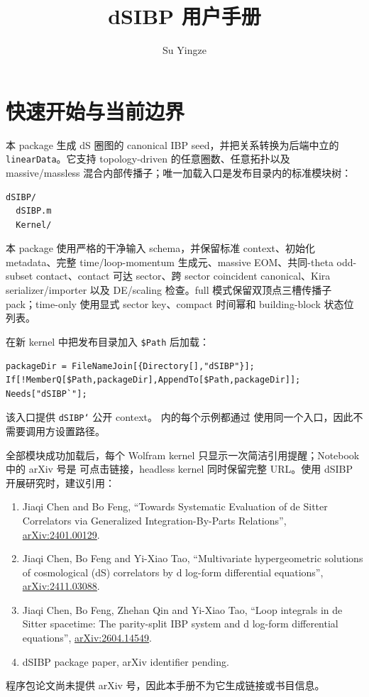 ﻿\documentclass[a4paper,11pt]{article}
\title{dSIBP 用户手册}
\author[a]{Su Yingze}
\affiliation[a]{Institute not specified}
\begin{document}
\sloppy
\setcounter{tocdepth}{1}
\maketitle
\newpage

\section{快速开始与当前边界}

本 package 生成 dS 圈图的 canonical IBP seed，并把关系转换为后端中立的 \texttt{linearData}。它支持 topology-driven 的任意圈数、任意拓扑以及 massive/massless 混合内部传播子；唯一加载入口是发布目录内的标准模块树：
\begin{verbatim}
dSIBP/
  dSIBP.m
  Kernel/
\end{verbatim}
本 package 使用严格的干净输入 schema，并保留标准 context、初始化 metadata、完整 time/loop-momentum 生成元、massive EOM、共同-theta odd-subset contact、contact 可达 sector、跨 sector coincident canonical、Kira serializer/importer 以及 DE/scaling 检查。full 模式保留双顶点三槽传播子 pack；time-only 使用显式 sector key、compact 时间幂和 building-block 状态位列表。

在新 kernel 中把发布目录加入 \texttt{\$Path} 后加载：
\begin{verbatim}
packageDir = FileNameJoin[{Directory[],"dSIBP"}];
If[!MemberQ[$Path,packageDir],AppendTo[$Path,packageDir]];
Needs["dSIBP`"];
\end{verbatim}
该入口提供 \texttt{dSIBP`} 公开 context。 内的每个示例都通过
 使用同一个入口，因此不需要调用方设置路径。

全部模块成功加载后，每个 Wolfram kernel 只显示一次简洁引用提醒；Notebook 中的 arXiv 号是
可点击链接，headless kernel 同时保留完整 URL。使用 dSIBP 开展研究时，建议引用：
\begin{enumerate}
  \item Jiaqi Chen and Bo Feng, ``Towards Systematic Evaluation of de Sitter Correlators via Generalized Integration-By-Parts Relations'', \href{https://arxiv.org/abs/2401.00129}{arXiv:2401.00129}.
  \item Jiaqi Chen, Bo Feng and Yi-Xiao Tao, ``Multivariate hypergeometric solutions of cosmological (dS) correlators by d log-form differential equations'', \href{https://arxiv.org/abs/2411.03088}{arXiv:2411.03088}.
  \item Jiaqi Chen, Bo Feng, Zhehan Qin and Yi-Xiao Tao, ``Loop integrals in de Sitter spacetime: The parity-split IBP system and d log-form differential equations'', \href{https://arxiv.org/abs/2604.14549}{arXiv:2604.14549}.
  \item dSIBP package paper, arXiv identifier pending.
\end{enumerate}
程序包论文尚未提供 arXiv 号，因此本手册不为它生成链接或书目信息。
\end{document}
